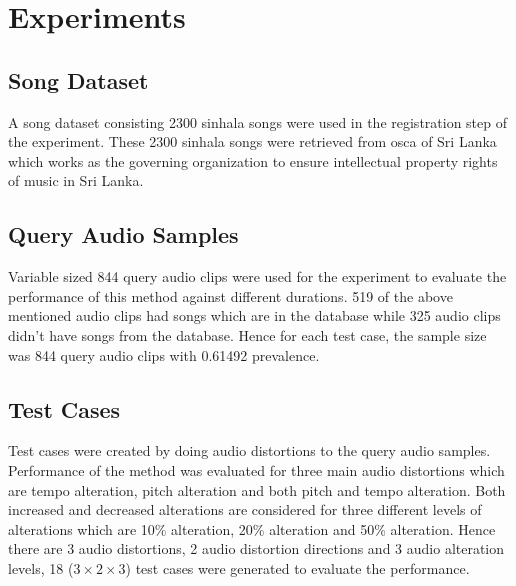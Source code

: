 \section{Experiments}
\label{section:experiments}

\subsection{Song Dataset}
A song dataset consisting 2300 sinhala songs were used in the registration step of the experiment. These 2300 sinhala songs were retrieved from
\ac{osca} of Sri Lanka which works as the governing organization to ensure intellectual property rights of music in Sri Lanka. 

\subsection{Query Audio Samples}
Variable sized 844 query audio clips were used for the experiment to evaluate the performance of this method
against different durations. 519 of the above mentioned audio clips had songs which are in the database while 325 audio clips didn't have songs from 
the database. Hence for each test case, the sample size was 844 query audio clips with 0.61492 prevalence.    

\subsection{Test Cases}
Test cases were created by doing audio distortions to the query audio samples. Performance of the method was evaluated for three main audio distortions
which are tempo alteration, pitch alteration and both pitch and tempo alteration. Both increased and decreased alterations are considered for three different
levels of alterations which are 10\% alteration, 20\% alteration and 50\% alteration. Hence there are 3 audio distortions, 2 audio distortion directions and
3 audio alteration levels, 18 (\(3 \times 2 \times 3\)) test cases were generated to evaluate the performance. 


